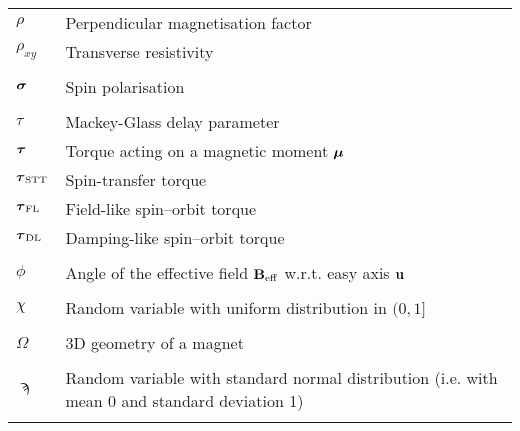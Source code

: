 \begin{longtable}[l]{p{60pt} p{350pt}}
	$\rho$ & Perpendicular magnetisation factor \\
	$\rho_{xy}$ & Transverse resistivity \\
	&\\
	
	$\boldsymbol{\mathbf{\sigma}}$ & Spin polarisation \\
	&\\

	$\tau$ & Mackey-Glass delay parameter \\
	$\boldsymbol{\mathbf{\tau}}$ & Torque acting on a magnetic moment $\boldsymbol{\mathbf{\mu}}$ \\
	$\boldsymbol{\mathbf{\tau}}_\mathrm{STT}$ & Spin-transfer torque \\
	$\boldsymbol{\mathbf{\tau}}_\mathrm{FL}$ & Field-like spin--orbit torque \\
	$\boldsymbol{\mathbf{\tau}}_\mathrm{DL}$ & Damping-like spin--orbit torque \\
	&\\

	$\phi$ & Angle of the effective field $\boldsymbol{\mathbf{B}}_\mathrm{eff}$ w.r.t. easy axis $\boldsymbol{\mathbf{u}}$ \\
	&\\

	$\chi$ & Random variable with uniform distribution in $(0, 1]$ \\
	&\\
	
	$\Omega$ & 3D geometry of a magnet \\
	&\\
	
	$\sampi$ & Random variable with standard normal distribution (i.e. with mean 0 and standard deviation 1) \\
	&\\
\end{longtable}

